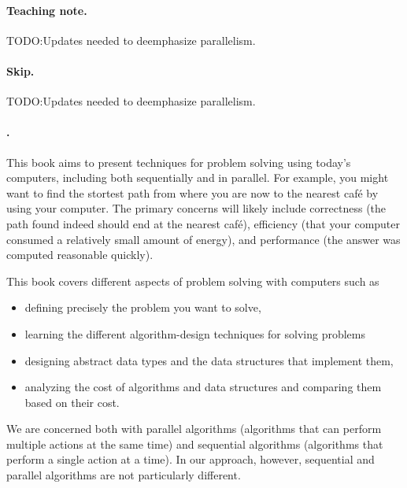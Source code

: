 \paragraph{Teaching note.}
TODO:Updates needed to deemphasize parallelism.

\paragraph{Skip.}
TODO:Updates needed to deemphasize parallelism.

\paragraph{.}
This book aims to present techniques for problem solving using today's
computers, including both sequentially and in parallel.
%
For example, you might want to find the stortest path from where you
are now to the nearest caf\'e by using your computer.
%
The primary concerns will likely include correctness (the path found
indeed should end at the nearest caf\'e), 
%
efficiency (that your computer consumed a relatively small amount of
energy), and performance (the answer was computed reasonable quickly).
%

This book covers different aspects of problem solving with computers
such as 
\begin{itemize}
\item defining precisely the problem you want to solve,
\item learning the different algorithm-design techniques for solving problems
\item designing abstract data types and the data structures that
  implement them,
%
\item analyzing the cost of algorithms and data structures and
  comparing them based on their cost.
%
\end{itemize}

We are concerned both with 
%
parallel algorithms (algorithms that can perform multiple actions at
the same time)
%
and 
%
sequential algorithms (algorithms that perform a single action at a
time).
%
In our approach, however, sequential and parallel algorithms are not
particularly different.
%




